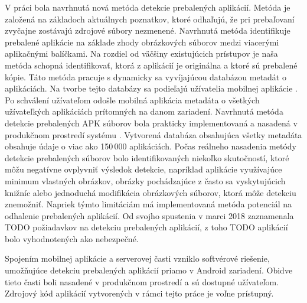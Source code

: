 V práci bola navrhnutá nová metóda detekcie prebalených aplikácií. Metóda je založená na základoch aktuálnych poznatkov, ktoré odhaľujú, že pri prebaľovaní zvyčajne zostávajú zdrojové súbory nezmenené. Navrhnutá metóda identifikuje prebalené aplikácie na základe zhody obrázkových súborov medzi viacerými aplikačnými balíčkami. Na rozdiel od väčšiny existujúcich prístupov je naša metóda schopná identifikovať, ktorá z aplikácií je originálna a ktoré sú prebalené kópie. Táto metóda pracuje s dynamicky sa vyvíjajúcou databázou metadát o aplikáciách. Na tvorbe tejto databázy sa podieľajú užívatelia mobilnej aplikácie . Po schválení užívateľom odošle mobilná aplikácia metadáta o všetkých užívateľkých aplikáciách prítomných na danom zariadení. Navrhnutá metóda detekcie prebalených APK súborov bola prakticky implementovaná a nasadená v produkčnom prostredí systému .
Vytvorená databáza obsahujúca všetky metadáta obsahuje údaje o viac ako 150\,000 aplikáciách. Počas reálneho nasadenia metódy detekcie prebalených súborov bolo identifikovaných niekoľko skutočností, ktoré môžu negatívne ovplyvniť výsledok detekcie, napríklad aplikácie využívajúce minimum vlastných obrázkov, obrázky pochádzajúce z často sa vyskytujúcich knižníc alebo jednoduchá modifikácia obrázkových súborov, ktorá môže detekciu znemožniť. Napriek týmto limitáciám má implementovaná metóda potenciál na odhalenie prebalených aplikácií. Od svojho spustenia v marci 2018 zaznamenala TODO požiadavkov na detekciu prebalených aplikácií, z toho TODO aplikácií bolo vyhodnotených ako nebezpečné.

Spojením mobilnej aplikácie a serverovej časti vzniklo softvérové riešenie, umožňujúce detekciu prebalených aplikácií priamo v Android zariadení. Obidve tieto časti boli nasadené v produkčnom prostredí a sú dostupné užívateľom. Zdrojový kód aplikácií vytvorených v rámci tejto práce je voľne prístupný.
